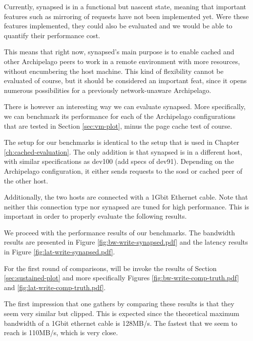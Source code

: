 Currently, synapsed is in a functional but nascent state, meaning that 
important features such as mirroring of requests have not been implemented yet.  
Were these features implemented, they could also be evaluated and we would be 
able to quantify their performance cost.

This means that right now, synapsed's main purpose is to enable cached and 
other Archipelago peers to work in a remote environment with more resources, 
without encumbering the host machine. This kind of flexibility cannot be 
evaluated of course, but it should be considered an important feat, since it 
opens numerous possibilities for a previously network-unaware Archipelago.

There is however an interesting way we can evaluate synapsed. More 
specifically, we can benchmark its performance for each of the Archipelago 
configurations that are tested in Section \ref{sec:vm-plot}, minus the page 
cache test of course. 

The setup for our benchmarks is identical to the setup that is used in Chapter 
\ref{ch:cached-evaluation}. The only addition is that synapsed is in a 
different host, with similar specifications as dev100 (\fixme add specs of 
dev91).  Depending on the Archipelago configuration, it either sends requests 
to the sosd or cached peer of the other host.

Additionally, the two hosts are connected with a 1Gbit Ethernet cable. Note 
that neither this connection type nor synapsed are tuned for high performance.  
This is important in order to properly evaluate the following results.

We proceed with the performance results of our benchmarks. The bandwidth 
results are presented in Figure \ref{fig:bw-write-synapsed.pdf} and the latency 
results in Figure \ref{fig:lat-write-synapsed.pdf}.


For the first round of comparisons, will be invoke the results of Section 
\ref{sec:sustained-plot} and more specifically Figures 
\ref{fig:bw-write-comp-truth.pdf} and \ref{fig:lat-write-comp-truth.pdf}.

The first impression that one gathers by comparing these results is that they 
seem very similar but clipped. This is expected since the theoretical maximum 
bandwidth of a 1Gbit ethernet cable is 128MB/s. The fastest that we seem to 
reach is 110MB/s, which is very close. 

